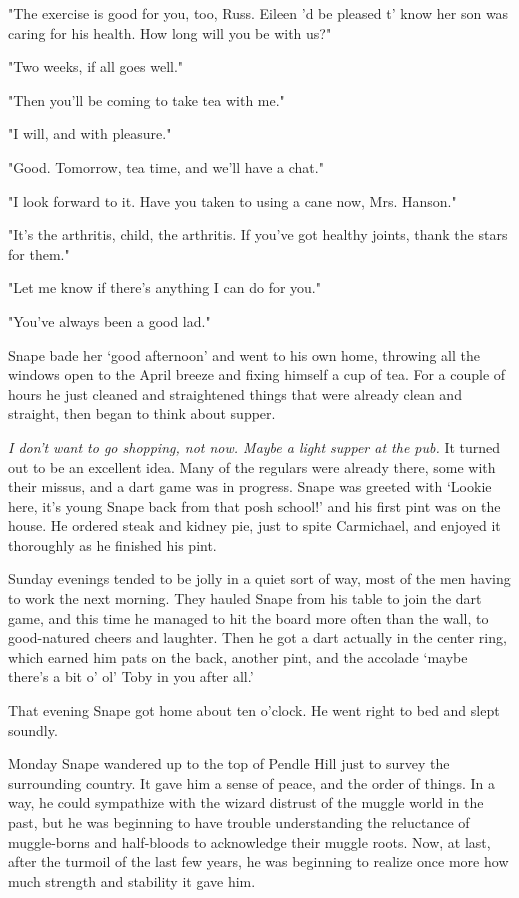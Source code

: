 \documentclass[a4paper,11pt]{article}
\begin{document}
"The exercise is good for you, too, Russ. Eileen 'd be pleased t' know her son was caring for his health. How long will you be with us?"

"Two weeks, if all goes well."

"Then you'll be coming to take tea with me."

"I will, and with pleasure."

"Good. Tomorrow, tea time, and we'll have a chat."

"I look forward to it. Have you taken to using a cane now, Mrs. Hanson."

"It's the arthritis, child, the arthritis. If you've got healthy joints, thank the stars for them."

"Let me know if there's anything I can do for you."

"You've always been a good lad."

Snape bade her `good afternoon' and went to his own home, throwing all the windows open to the April breeze and fixing himself a cup of tea. For a couple of hours he just cleaned and straightened things that were already clean and straight, then began to think about supper.

\emph{I don't want to go shopping, not now. Maybe a light supper at the pub.} It turned out to be an excellent idea. Many of the regulars were already there, some with their missus, and a dart game was in progress. Snape was greeted with `Lookie here, it's young Snape back from that posh school!' and his first pint was on the house. He ordered steak and kidney pie, just to spite Carmichael, and enjoyed it thoroughly as he finished his pint.

Sunday evenings tended to be jolly in a quiet sort of way, most of the men having to work the next morning. They hauled Snape from his table to join the dart game, and this time he managed to hit the board more often than the wall, to good-natured cheers and laughter. Then he got a dart actually in the center ring, which earned him pats on the back, another pint, and the accolade `maybe there's a bit o' ol' Toby in you after all.'

That evening Snape got home about ten o'clock. He went right to bed and slept soundly.

Monday Snape wandered up to the top of Pendle Hill just to survey the surrounding country. It gave him a sense of peace, and the order of things. In a way, he could sympathize with the wizard distrust of the muggle world in the past, but he was beginning to have trouble understanding the reluctance of muggle-borns and half-bloods to acknowledge their muggle roots. Now, at last, after the turmoil of the last few years, he was beginning to realize once more how much strength and stability it gave him.
\end{document}
